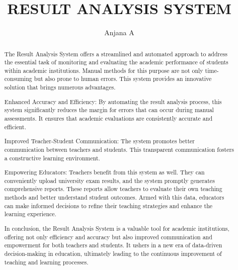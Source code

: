 \documentclass{nascproject}
\title{RESULT ANALYSIS SYSTEM}
\author{Anjana A}
\begin{document}
\maketitle

\makecert

\newpage
\setcounter{page}{1}
\renewcommand\abstractname{ABSTRACT}
\begin{abstract}
\vspace{5cm}

The Result Analysis System offers a streamlined and automated approach to address the essential task of monitoring and evaluating the academic performance of students within academic institutions. Manual methods for this purpose are not only time-consuming but also prone to human errors. This system provides an innovative solution that brings numerous advantages.

Enhanced Accuracy and Efficiency: By automating the result analysis process, this system significantly reduces the margin for errors that can occur during manual assessments. It ensures that academic evaluations are consistently accurate and efficient.

Improved Teacher-Student Communication: The system promotes better communication between teachers and students. This transparent communication fosters a constructive learning environment.

Empowering Educators: Teachers benefit from this system as well. They can conveniently upload university exam results, and the system promptly generates comprehensive reports. These reports allow teachers to evaluate their own teaching methods and better understand student outcomes. Armed with this data, educators can make informed decisions to refine their teaching strategies and enhance the learning experience.

In conclusion, the Result Analysis System is a valuable tool for academic institutions, offering not only efficiency and accuracy but also improved communication and empowerment for both teachers and students. It ushers in a new era of data-driven decision-making in education, ultimately leading to the continuous improvement of teaching and learning processes.
\end{abstract}
\end{document}
